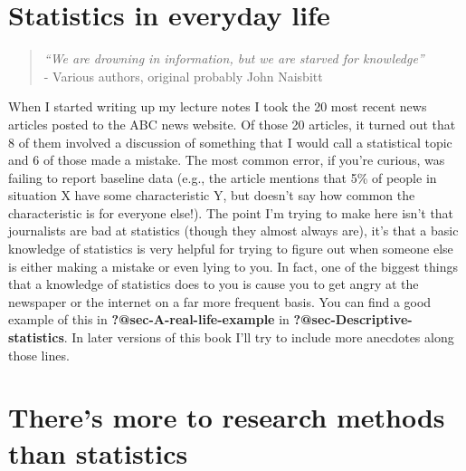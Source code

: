 \documentclass[
  letterpaper,
]{book}
\begin{document}
\hypertarget{statistics-in-everyday-life}{%
\section{Statistics in everyday
life}\label{statistics-in-everyday-life}}

\begin{quote}
\emph{``We are drowning in information,\emph{\hfill\break
}but we are starved for knowledge''}\\
- Various authors, original probably John Naisbitt
\end{quote}

When I started writing up my lecture notes I took the 20 most recent
news articles posted to the ABC news website. Of those 20 articles, it
turned out that 8 of them involved a discussion of something that I
would call a statistical topic and 6 of those made a mistake. The most
common error, if you're curious, was failing to report baseline data
(e.g., the article mentions that 5\% of people in situation X have some
characteristic Y, but doesn't say how common the characteristic is for
everyone else!). The point I'm trying to make here isn't that
journalists are bad at statistics (though they almost always are), it's
that a basic knowledge of statistics is very helpful for trying to
figure out when someone else is either making a mistake or even lying to
you. In fact, one of the biggest things that a knowledge of statistics
does to you is cause you to get angry at the newspaper or the internet
on a far more frequent basis. You can find a good example of this in
\textbf{?@sec-A-real-life-example} in
\textbf{?@sec-Descriptive-statistics}. In later versions of this book
I'll try to include more anecdotes along those lines.

\hypertarget{theres-more-to-research-methods-than-statistics}{%
\section{There's more to research methods than
statistics}\label{theres-more-to-research-methods-than-statistics}}
\end{document}
